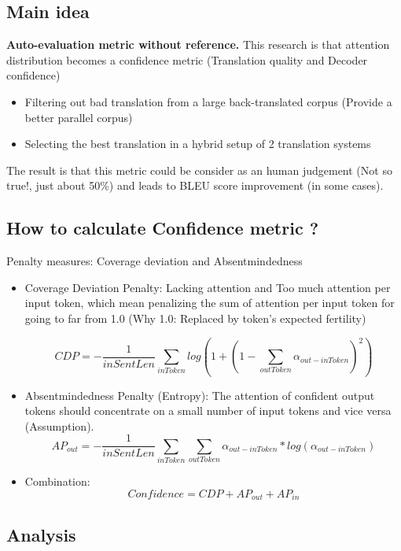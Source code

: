 \documentclass{article}
\begin{document}
\subsection{Main idea}
\textbf{Auto-evaluation metric without reference.}
This research is that attention distribution becomes a confidence metric (Translation quality and Decoder confidence)
\begin{itemize}
\item Filtering out bad translation from a large back-translated corpus (Provide a better parallel corpus)
\item Selecting the best translation in a hybrid setup of 2 translation systems
\end{itemize}
The result is that this metric could be consider as an human judgement (Not so true!, just about 50\%) and leads to BLEU score improvement (in some cases).

\subsection{How to calculate Confidence metric ?}
Penalty measures: Coverage deviation and Absentmindedness
\begin{itemize}
\item Coverage Deviation Penalty: Lacking attention and Too much attention per input token, which mean penalizing the sum of attention per input token for going to far from 1.0 (Why 1.0: Replaced by token's expected fertility)

\begin{equation}
CDP = -\frac{1}{inSentLen}\sum_{inToken} log(1 + (1 - \sum_{outToken} \alpha_{out-inToken})^2 )
\end{equation}

\item Absentmindedness Penalty (Entropy): The attention of confident output tokens should concentrate on a small number of input tokens and vice versa (Assumption).
\begin{equation}
AP_{out} = -\frac{1}{inSentLen}\sum_{inToken} \sum_{outToken} \alpha_{out-inToken} * log (\alpha_{out-inToken})
\end{equation}

\item Combination:
\begin{equation}
Confidence = CDP + AP_{out} + AP_{in}
\end{equation}
\end{itemize}

\subsection{Analysis}
\end{document}
